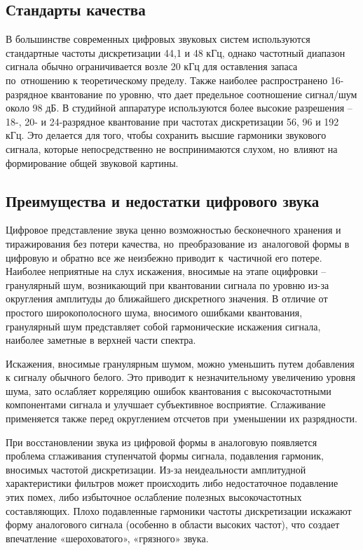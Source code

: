 \documentclass{ou}
\begin{document}
\subsection{Стандарты качества}
В большинстве современных цифровых звуковых систем используются стандартные частоты дискретизации 44,1 и 48 кГц, однако частотный диапазон сигнала обычно ограничивается возле 20 кГц для оставления запаса по~отношению к теоретическому пределу. Также наиболее распространено 16-разрядное квантование по уровню, что дает предельное соотношение сигнал/шум около 98 дБ. В студийной аппаратуре используются более высокие разрешения -- 18-, 20- и 24-разрядное квантование при частотах дискретизации 56, 96 и 192 кГц. Это делается для того, чтобы сохранить высшие гармоники звукового сигнала, которые непосредственно не воспринимаются слухом, но~влияют на формирование общей звуковой картины\cite{ixbt}.
\subsection{Преимущества и недостатки цифрового звука}
Цифровое представление звука ценно возможностью бесконечного хранения и тиражирования без потери качества, но~преобразование из~аналоговой формы в цифровую и обратно все же неизбежно приводит к~частичной его потере. Наиболее неприятные на слух искажения, вносимые на этапе оцифровки -- гранулярный шум, возникающий при квантовании сигнала по уровню из-за округления амплитуды до ближайшего дискретного значения. В отличие от простого широкополосного шума, вносимого ошибками квантования, гранулярный шум представляет собой гармонические искажения сигнала, наиболее заметные в верхней части спектра.

Искажения, вносимые гранулярным шумом, можно уменьшить путем добавления к сигналу обычного белого. Это приводит к незначительному увеличению уровня шума, зато ослабляет корреляцию ошибок квантования с высокочастотными компонентами сигнала и улучшает субъективное восприятие. Сглаживание применяется также перед округлением отсчетов при~уменьшении их разрядности. 

При восстановлении звука из цифровой формы в аналоговую появляется проблема сглаживания ступенчатой формы сигнала, подавления гармоник, вносимых частотой дискретизации. Из-за неидеальности амплитудной характеристики фильтров может происходить либо недостаточное подавление этих помех, либо избыточное ослабление полезных высокочастотных составляющих. Плохо подавленные гармоники частоты дискретизации искажают форму аналогового сигнала (особенно в области высоких частот), что создает впечатление «шероховатого», «грязного» звука\cite{3dnews}.
\newpage
\end{document}
